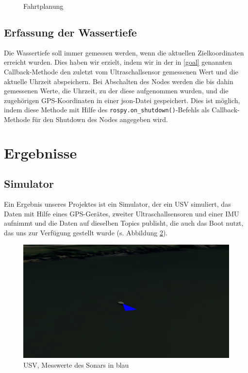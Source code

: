 \documentclass[11pt]{article}
\begin{document}
\begin{figure}
	\centering
	\resizebox{0.8\textwidth}{!}{}
	\caption{Fahrtplanung}
	\label{Fahrtplanung}
\end{figure}

\subsection{Erfassung der Wassertiefe} \label{measurements}
Die Wassertiefe soll immer gemessen werden, wenn die aktuellen Zielkoordinaten erreicht wurden. Dies haben wir erzielt, indem wir in der in \ref{goal} genannten Callback-Methode den zuletzt vom Ultraschallsensor gemessenen Wert und die aktuelle Uhrzeit abspeichern. Bei Abschalten des Nodes werden die bis dahin gemessenen Werte, die Uhrzeit, zu der diese aufgenommen wurden, und die zugehörigen GPS-Koordinaten in einer json-Datei gespeichert. Dies ist möglich, indem diese Methode mit Hilfe des \texttt{rospy.on\_shutdown()}-Befehls als Callback-Methode für den Shutdown des Nodes angegeben wird.

\section{Ergebnisse}

\subsection{Simulator}
Ein Ergebnis unseres Projektes ist ein Simulator, der ein USV simuliert, das Daten mit Hilfe eines GPS-Gerätes, zweiter Ultraschallsensoren und einer IMU aufnimmt und die Daten auf dieselben Topics publisht, die auch das Boot nutzt, das uns zur Verfügung gestellt wurde (s. Abbildung \ref{sonar}).

\begin{figure}
	\centering
	\includegraphics[width=0.8\linewidth]{sonar_boot.jpg}
	\caption{USV, Messwerte des Sonars in blau}
	\label{sonar}
\end{figure}
\end{document}
